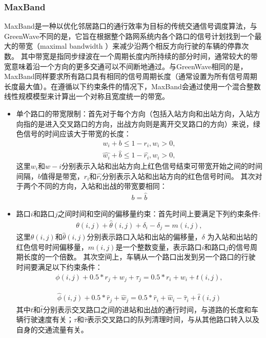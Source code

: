 \subsubsection{MaxBand}
MaxBand是一种以优化邻居路口的通行效率为目标的传统交通信号调度算法，与GreenWave不同的是，它旨在根据整个路网系统内各个路口的信号计划找到一个最大的带宽（maximal bandwidth ）来减少沿两个相反方向行驶的车辆的停靠次数。
其中带宽是指同步绿波在一个周期长度内所持续的部分时间，通常较大的带宽意味着沿一个方向的更多交通可以不间断地通过。与GreenWave相同的是，MaxBand同样要求所有路口具有相同的信号周期长度（通常设置为所有信号周期长度最大值）。在遵循以下约束条件的情况下，MaxBand会通过使用一个混合整数线性规模模型来计算出一个对称且宽度统一的带宽。
\begin{itemize}
    \item 单个路口的带宽限制：首先对于每个方向（包括入站方向和出站方向，入站方向指的是进入交叉路口的方向，出战方向则是离开交叉路口的方向）来说，绿色信号的时间应该大于带宽的长度：
    \begin{align}
        \label{eq:band-cons-1}
        w_i + b \leq 1- r_i, w_i > 0,
    \end{align}
    \begin{align}
        \label{eq:band-cons-2}
        \hat{w_i} + \hat{b} \leq 1- \hat{r_i}, w_i > 0,
    \end{align}
    这里$w_i \text{和} \hat{w-i}$分别表示入站和出站方向上红色信号结束可带宽开始之间的时间间隔，$b$值得是带宽，$r_i \text{和} \hat{r_i}$分别表示入站和出站方向的红色信号时间。
    其次对于两个不同的方向，入站和出战的带宽要相同：
    \begin{align}
        \label{eq:band-cons-3}
        b = \hat{b}
    \end{align}
    \item 路口$i$和路口$j$之间时间和空间的偏移量约束：首先时间上要满足下列约束条件:
    \begin{align}
        \label{eq:temporal-cons}
        \theta(i,j) + \hat{\theta}(i,j) + \delta_i - \delta_j = m(i,j),
    \end{align}
    这里$\theta(i,j)\textbf{和}\hat{\theta}(i,j)$分别表示路口入站和出站的偏移量，$\delta$ 为入站和出站的红色信号时间偏移量，$m(i,j)$是一个整数变量，表示路口$i$和路口$j$的信号周期长度的一个倍数。
    其次空间上，车辆从一个路口出发到另一个路口的行驶时间要满足以下约束条件：
    \begin{align}
        \label{eq:spataril-cons-1}
        \phi(i, j)+0.5 * r_{j}+w_{j}+\tau_{j}=0.5 * r_{i}+w_{i}+t(i, j),
    \end{align}

    \begin{align}
        \label{eq:spataril-cons-2}
        \hat{\phi}(i, j)+0.5 * \hat{r}_{j}+\hat{w}_{j}=0.5 * \hat{r}_{i}+\hat{w}_{i}-\hat{\tau}_{i}+\hat{t}(i, j)
    \end{align}
    其中$t\text{和}\hat{t}$分别表示交叉路口之间的进站和出战的通行时间，与道路的长度和车辆行驶速度有关；$\tau \text{和} \hat{\tau}$表示交叉路口的队列清理时间，与从其他路口转入以及自身的交通流量有关。
\end{itemize}
